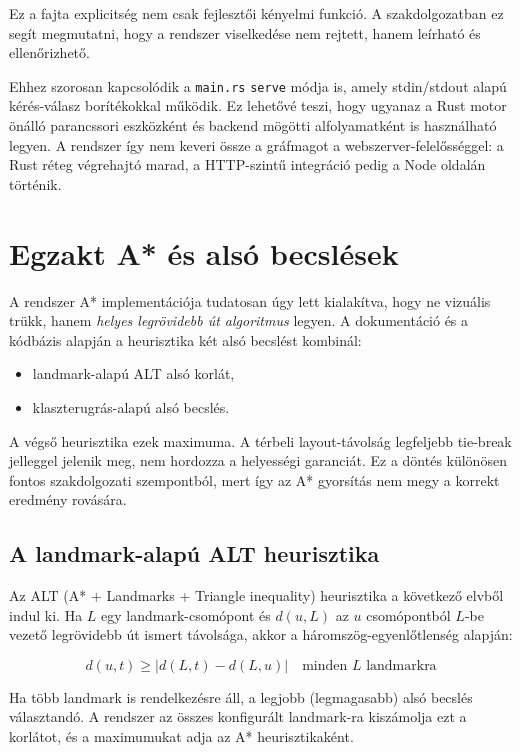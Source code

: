 ﻿\documentclass[a4paper,12pt]{report}
\begin{document}
Ez a fajta explicitség nem csak fejlesztői kényelmi funkció. A szakdolgozatban ez segít megmutatni, hogy a rendszer viselkedése nem rejtett, hanem leírható és ellenőrizhető.

Ehhez szorosan kapcsolódik a \texttt{main.rs} \texttt{serve} módja is, amely stdin/stdout alapú kérés-válasz borítékokkal működik. Ez lehetővé teszi, hogy ugyanaz a Rust motor önálló parancssori eszközként és backend mögötti alfolyamatként is használható legyen. A rendszer így nem keveri össze a gráfmagot a webszerver-felelősséggel: a Rust réteg végrehajtó marad, a HTTP-szintű integráció pedig a Node oldalán történik.

\section{Egzakt A* és alsó becslések}

A rendszer A* implementációja tudatosan úgy lett kialakítva, hogy ne vizuális trükk, hanem \emph{helyes legrövidebb út algoritmus} legyen. A dokumentáció és a kódbázis alapján a heurisztika két alsó becslést kombinál:

\begin{itemize}
    \item landmark-alapú ALT alsó korlát,
    \item klaszterugrás-alapú alsó becslés.
\end{itemize}

A végső heurisztika ezek maximuma. A térbeli layout-távolság legfeljebb tie-break jelleggel jelenik meg, nem hordozza a helyességi garanciát. Ez a döntés különösen fontos szakdolgozati szempontból, mert így az A* gyorsítás nem megy a korrekt eredmény rovására.

\subsection{A landmark-alapú ALT heurisztika}

Az ALT (A* + Landmarks + Triangle inequality) heurisztika \cite{goldberg2005} a következő elvből indul ki. Ha $L$ egy landmark-csomópont és $d(u, L)$ az $u$ csomópontból $L$-be vezető legrövidebb út ismert távolsága, akkor a háromszög-egyenlőtlenség alapján:

\begin{equation}
d(u, t) \geq |d(L, t) - d(L, u)| \quad \text{minden } L \text{ landmarkra}
\end{equation}

Ha több landmark is rendelkezésre áll, a legjobb (legmagasabb) alsó becslés választandó. A rendszer az összes konfigurált landmark-ra kiszámolja ezt a korlátot, és a maximumukat adja az A* heurisztikaként.
\end{document}
